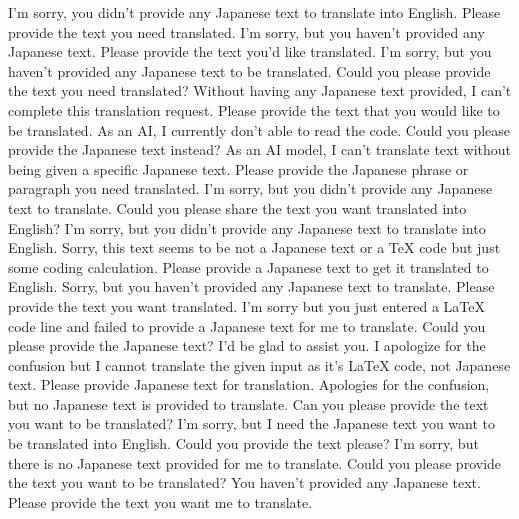 {%
I'm sorry, you didn't provide any Japanese text to translate into English. Please provide the text you need translated.
I'm sorry, but you haven't provided any Japanese text. Please provide the text you'd like translated.
I'm sorry, but you haven't provided any Japanese text to be translated. Could you please provide the text you need translated?
Without having any Japanese text provided, I can't complete this translation request. Please provide the text that you would like to be translated.
As an AI, I currently don't able to read the code. Could you please provide the Japanese text instead?
As an AI model, I can't translate text without being given a specific Japanese text. Please provide the Japanese phrase or paragraph you need translated.
I'm sorry, but you didn't provide any Japanese text to translate. Could you please share the text you want translated into English?
I'm sorry, but you didn't provide any Japanese text to translate into English.
Sorry, this text seems to be not a Japanese text or a TeX code but just some coding calculation. Please provide a Japanese text to get it translated to English.
Sorry, but you haven't provided any Japanese text to translate. Please provide the text you want translated.
I'm sorry but you just entered a LaTeX code line and failed to provide a Japanese text for me to translate. Could you please provide the Japanese text? I'd be glad to assist you.
I apologize for the confusion but I cannot translate the given input as it's LaTeX code, not Japanese text. Please provide Japanese text for translation.
Apologies for the confusion, but no Japanese text is provided to translate. Can you please provide the text you want to be translated?
I'm sorry, but I need the Japanese text you want to be translated into English. Could you provide the text please?
I'm sorry, but there is no Japanese text provided for me to translate. Could you please provide the text you want to be translated?
You haven't provided any Japanese text. Please provide the text you want me to translate.
}
